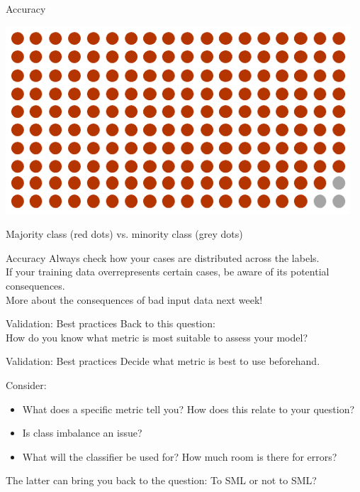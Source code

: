 \documentclass[compress]{beamer}
\begin{document}
\begin{frame}{Accuracy}
	
\begin{center}
	\includegraphics[width=\linewidth,height=\textheight,keepaspectratio]{../pictures/imbalance.png} 
\end{center}	

Majority class (red dots) vs. minority class (grey dots) 
\end{frame}

\begin{frame}{Accuracy}
Always check how your cases are distributed across the labels. \\
If your training data overrepresents certain cases, be aware of its potential consequences.\\
More about the consequences of bad input data next week!
\end{frame}

\begin{frame}{Validation: Best practices}
Back to this question: \\
How do you know what metric is most suitable to assess your model?
\end{frame}


\begin{frame}{Validation: Best practices}
Decide what metric is best to use beforehand.

\begin{alertblock}{Consider:}
	\begin{itemize}
		\item What does a specific metric tell you? How does this relate to your question?
		\item Is class imbalance an issue? 
		\item What will the classifier be used for? How much room is there for errors?
	\end{itemize}
\end{alertblock}

The latter can bring you back to the question: To SML or not to SML?
\end{frame}
\end{document}
